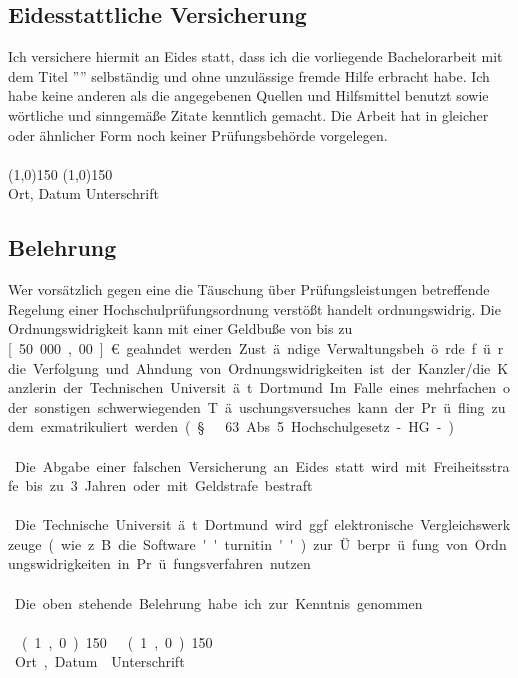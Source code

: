 \thispagestyle{empty}
\begin{center}
\section*{Eidesstattliche Versicherung}
\end{center}
\vspace*{1cm}
\noindent
Ich versichere hiermit an Eides statt, dass ich die vorliegende Bachelorarbeit mit dem Titel ''{\thetitle}'' selbst\"andig und ohne unzul\"assige fremde Hilfe erbracht habe. Ich habe keine anderen als die angegebenen
Quellen und Hilfsmittel benutzt sowie w\"ortliche und sinngem\"a\ss e Zitate kenntlich gemacht.
Die Arbeit hat in gleicher oder \"ahnlicher Form noch keiner Pr\"ufungsbeh\"orde vorgelegen.
\vspace*{1cm}
\ \\
\ \\
\line(1,0){150} \hfill \line(1,0){150}\\
Ort, Datum \hfill Unterschrift \hspace*{3cm}
\vspace*{1.5cm}

\subsection*{Belehrung}
Wer vors\"atzlich gegen eine die T\"auschung \"uber Pr\"ufungsleistungen betreffende Regelung einer Hochschulpr\"ufungsordnung
verst\"o\ss t handelt ordnungswidrig. Die Ordnungswidrigkeit kann mit einer Geldbu\ss e von bis zu \unit[50.000,00]{\euro} geahndet werden. Zust\"andige Verwaltungsbeh\"orde f\"ur die Verfolgung und Ahndung von Ordnungswidrigkeiten ist
der Kanzler/die Kanzlerin der Technischen Universit\"at Dortmund. Im Falle eines mehrfachen oder sonstigen schwerwiegenden T\"auschungsversuches kann der Pr\"ufling zudem exmatrikuliert werden (\S\ 63 Abs. 5 Hochschulgesetz - HG - ).\\
\ \\
Die Abgabe einer falschen Versicherung an Eides statt wird mit Freiheitsstrafe bis zu 3 Jahren oder mit Geldstrafe bestraft.\\
\ \\
Die Technische Universit\"at Dortmund wird ggf. elektronische Vergleichswerkzeuge (wie z.B. die Software ''turnitin'') zur \"Uberpr\"ufung von Ordnungswidrigkeiten in Pr\"ufungsverfahren nutzen.\\
\ \\
Die oben stehende Belehrung habe ich zur Kenntnis genommen.
\vspace*{1cm}
\ \\
\ \\
\line(1,0){150} \hfill \line(1,0){150}\\
Ort, Datum \hfill Unterschrift \hspace*{3cm}
\vspace*{\fill}
